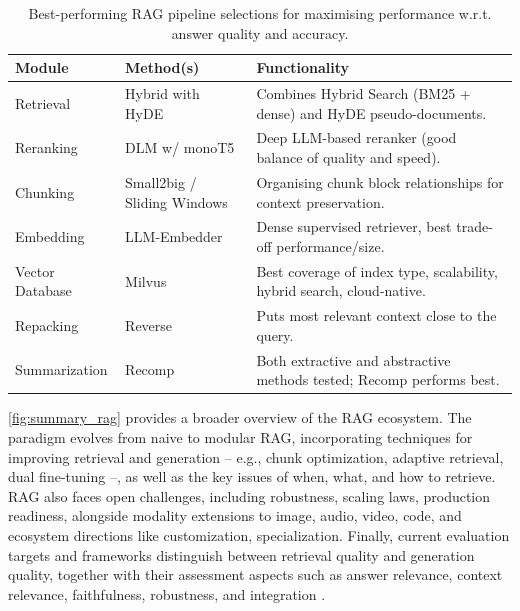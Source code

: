 \begin{spacing}{1.5}
\addtocounter{table}{-1}
\begin{table}[H]
\centering
\begin{tabularx}{\textwidth}{l>{\raggedright\arraybackslash}X>{\raggedright\arraybackslash}X}
\toprule
\textbf{Module}         & \textbf{Method(s)} & \textbf{Functionality} \\
\midrule
Retrieval         & Hybrid with HyDE            & Combines Hybrid Search (BM25 + dense) and HyDE pseudo-documents. \\
\cmidrule(lr){1-3}
Reranking         & DLM w/ monoT5                      & Deep LLM-based reranker (good balance of quality and speed). \\
\cmidrule(lr){1-3}
Chunking          & Small2big / Sliding Windows & Organising chunk block relationships for context preservation. \\
\cmidrule(lr){1-3}
Embedding         & LLM-Embedder                & Dense supervised retriever, best trade-off performance/size. \\
\cmidrule(lr){1-3}
Vector Database   & Milvus                      & Best coverage of index type, scalability, hybrid search, cloud-native. \\
\cmidrule(lr){1-3}
Repacking         & Reverse                     & Puts most relevant context close to the query. \\
\cmidrule(lr){1-3}
Summarization     & Recomp                      & Both extractive and abstractive methods tested; Recomp performs best. \\
\bottomrule
\end{tabularx}
\vspace{0.5em}
\caption{Best-performing RAG pipeline selections for maximising performance w.r.t. answer quality and accuracy.}
\label{tab:best_rag}
\end{table}

\autoref{fig:summary_rag} provides a broader overview of the RAG ecosystem. The paradigm evolves from naive to modular RAG, incorporating techniques for improving retrieval and generation -- e.g., chunk optimization, adaptive retrieval, dual fine-tuning --, as well as the key issues of when, what, and how to retrieve. RAG also faces open challenges, including robustness, scaling laws, production readiness, alongside modality extensions to image, audio, video, code, and ecosystem directions like customization, specialization. Finally, current evaluation targets and frameworks distinguish between retrieval quality and generation quality, together with their assessment aspects such as answer relevance, context relevance, faithfulness, robustness, and integration \citep{gao_retrieval-augmented_2024}.


\end{spacing}
